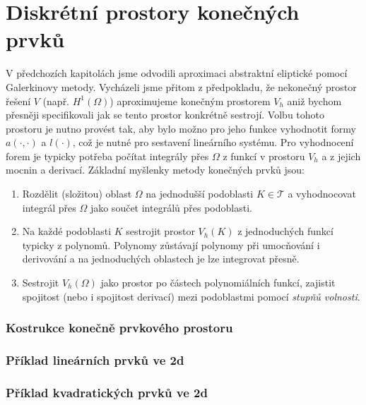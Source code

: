 \section{Diskrétní prostory konečných prvků}
V předchozích kapitolách jsme odvodili aproximaci abstraktní eliptické pomocí Galerkinovy metody.
Vycházeli jsme přitom z předpokladu, že nekonečný prostor řešení $V$ (např. $H^1(\Omega)$) aproximujeme
konečným prostorem $V_h$ aniž bychom přesněji specifikovali jak se tento prostor konkrétně sestrojí.
Volbu tohoto prostoru je nutno provést tak, aby bylo možno pro jeho funkce vyhodnotit formy $a(\cdot, \cdot)$
a $l(\cdot)$, což je nutné pro sestavení lineárního systému. Pro vyhodnocení forem je typicky potřeba 
počítat integrály přes $\Omega$ z funkcí v prostoru $V_h$ a z jejich mocnin a derivací. 
Základní myšlenky metody konečných prvků jsou:
\begin{enumerate}
 \item Rozdělit (složitou) oblast $\Omega$ na jednodušší podoblasti $K\in \mathcal T$ a vyhodnocovat integrál přes 
 $\Omega$ jako součet integrálů přes podoblasti.
 \item Na každé podoblasti $K$ sestrojit prostor $V_h(K)$ z jednoduchých funkcí typicky z polynomů. Polynomy zůstávají polynomy 
 při umocňování i derivování a na jednoduchých oblastech je lze integrovat přesně.
 \item Sestrojit $V_h(\Omega)$ jako prostor po částech polynomiálních funkcí, zajistit spojitost (nebo i spojitost derivací) mezi podoblastmi 
 pomocí {\it stupňů volnosti}.
\end{enumerate}

\subsubsection{Kostrukce konečně prvkového prostoru}

\subsubsection{Příklad lineárních prvků ve 2d}

\subsubsection{Příklad kvadratických prvků ve 2d}

